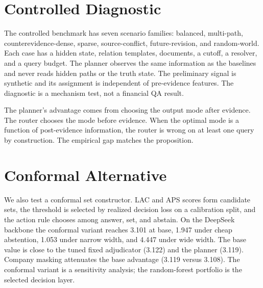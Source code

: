 \documentclass[11pt]{article}
\begin{document}
\section{Controlled Diagnostic}
\label{app:controlled}

The controlled benchmark has seven scenario families: balanced, multi-path, counterevidence-dense, sparse, source-conflict, future-revision, and random-world. Each case has a hidden state, relation templates, documents, a cutoff, a resolver, and a query budget. The planner observes the same information as the baselines and never reads hidden paths or the truth state. The preliminary signal is synthetic and its assignment is independent of pre-evidence features. The diagnostic is a mechanism test, not a financial QA result.

The planner's advantage comes from choosing the output mode after evidence. The router chooses the mode before evidence. When the optimal mode is a function of post-evidence information, the router is wrong on at least one query by construction. The empirical gap matches the proposition.

\section{Conformal Alternative}
\label{app:conformal}

We also test a conformal set constructor. LAC and APS scores form candidate sets, the threshold is selected by realized decision loss on a calibration split, and the action rule chooses among answer, set, and abstain. On the DeepSeek backbone the conformal variant reaches 3.101 at base, 1.947 under cheap abstention, 1.053 under narrow width, and 4.447 under wide width. The base value is close to the tuned fixed adjudicator (3.122) and the planner (3.119). Company masking attenuates the base advantage (3.119 versus 3.108). The conformal variant is a sensitivity analysis; the random-forest portfolio is the selected decision layer.
\end{document}
